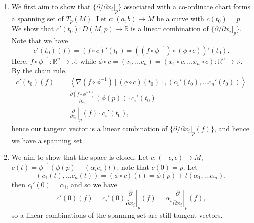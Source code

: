 \documentclass[letter-paper]{tufte-book}
\newenvironment{proof}[1][Proof]{\begin{trivlist}
\item[\hskip \labelsep {\bfseries #1}]}{\end{trivlist}}
\begin{document}
\begin{proof}
  \begin{enumerate}
    \item We first aim to show that $\{\left.\partial / \partial x_i\right|_p\}$ associated with a co-ordinate chart forms a spanning set of $T_p(M)$. Let $c:(a,b) \to M$ be a curve with $c(t_0)=p$. We show that $c'(t_0):D(M,p) \to \mathbb{R}$ is a linear combination of $\{\left.\partial / \partial x_i\right|_p\}$. Note that we have
    \begin{equation*}
      c'(t_0)(f) = (f\circ c)'(t_0) = \left((f\circ \phi^{-1}) \circ (\phi \circ c)\right)'(t_0).
    \end{equation*}
    Here, $f\circ \phi^{-1} : \mathbb{R}^n \to \mathbb{R}$, while $\phi\circ c = (c_1, \ldots c_n) = (x_1 \circ c, \ldots x_n \circ c): \mathbb{R}^n \to \mathbb{R}$. By the chain rule,
    \begin{align*}
      c'(t_0)(f) &= \left\langle \nabla(f\circ \phi^{-1})[(\phi\circ c)(t_0)], (c_1'(t_0), \ldots c_n'(t_0)) \right\rangle\\
        &= \frac{\partial (f\circ \phi^{-1})}{\partial x_i}(\phi(p))\cdot c_i'(t_0)\\
        &= \left.\frac{\partial}{\partial x_i}\right|_p(f)\cdot c_i'(t_0),
    \end{align*}
    hence our tangent vector is a linear combination of $\{\left.\partial / \partial x_i\right|_p(f)\}$, and hence we have a spanning set.
    
    \item We aim to show that the space is closed. Let $c:(-\epsilon, \epsilon) \to M$, $c(t) = \phi^{-1}(\phi(p) + (\alpha_i e_i)t)$; note that $c(0) = p$. Let 
    \begin{equation*}
      (c_1(t), \ldots c_n(t)) = (\phi\circ c)(t) = \phi(p) + t(\alpha_1, \ldots \alpha_n),
    \end{equation*}
    then $c_i'(0) = \alpha_i$, and so we have
    \begin{equation*}
      c'(0)(f) = c_i'(0)\left.\frac{\partial}{\partial x_i}\right|_p(f) = \alpha_i \left.\frac{\partial}{\partial x_i}\right|_p(f),
    \end{equation*}
    so a linear combinations of the spanning set are still tangent vectors.
    

\end{enumerate}
\end{proof}
\end{document}

